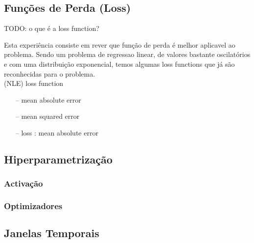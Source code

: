 \subsection{Funções de Perda (Loss)}

TODO: o que é a loss function?

Esta experiência consiste em rever que função de perda é melhor aplicavel ao problema. Sendo um problema de regressao linear, de valores bastante oscilatórios e com uma distribuição exponencial, temos algumas loss functions que já são reconhecidas para o problema.\\


(NLE) loss function %

\begin{itemize}
    \item[--] mean absolute error
    \item[--] mean squared error    
    \item[--] loss : mean absolute error

\end{itemize}



\subsection{Hiperparametrização}

\subsubsection{Activação}

\subsubsection{Optimizadores}

\subsection{Janelas Temporais}


